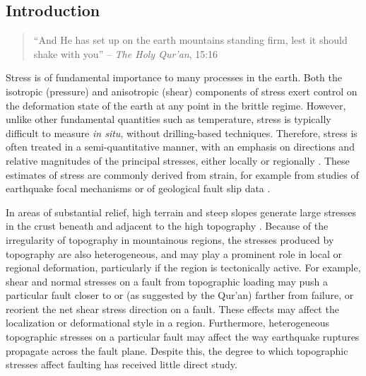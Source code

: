 \documentclass[twocolumn,jgrga]{AGUTeX}
\begin{document}
\begin{article}
\section{Introduction}\label{introduction}

\begin{quote}
``And He has set up on the earth mountains standing firm, lest it should
shake with you'' -- \emph{The Holy Qur'an}, 15:16
\end{quote}

Stress is of fundamental importance to many processes in the earth. Both
the isotropic (pressure) and anisotropic (shear) components of stress
exert control on the deformation state of the earth at any point in the
brittle regime. However, unlike other fundamental quantities such as
temperature, stress is typically difficult to measure \emph{in situ},
without drilling-based techniques. Therefore, stress is often treated in
a semi-quantitative manner, with an emphasis on directions and relative
magnitudes of the principal stresses, either locally or regionally
\citep[e.g.,][]{angelier1994}. These estimates of stress are commonly
derived from strain, for example from studies of earthquake focal
mechanisms \citep[e.g.,][]{michael1987} or of geological fault slip data
\citep[e.g.,][]{reches1987}.

In areas of substantial relief, high terrain and steep slopes generate
large stresses in the crust beneath and adjacent to the high topography
\citep{jeffreys1924, coblentz1996}. Because of the irregularity of
topography in mountainous regions, the stresses produced by topography
are also heterogeneous, and may play a prominent role in local or
regional deformation, particularly if the region is tectonically active.
For example, shear and normal stresses on a fault from topographic
loading may push a particular fault closer to or (as suggested by the
Qur'an) farther from failure, or reorient the net shear stress direction
on a fault. These effects may affect the localization or deformational
style in a region. Furthermore, heterogeneous topographic stresses on a
particular fault may affect the way earthquake ruptures propagate across
the fault plane. Despite this, the degree to which topographic stresses
affect faulting has received little direct study.


\end{article}
\end{document}
